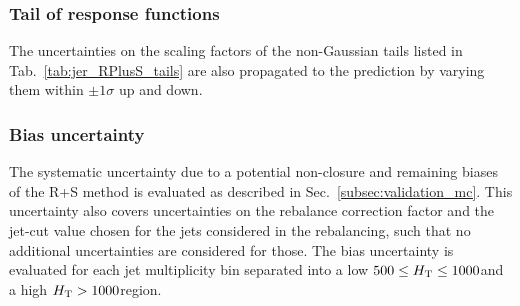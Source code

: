 \subsubsection*{Tail of response functions} The uncertainties on the scaling factors of the non-Gaussian tails listed in Tab.~\ref{tab:jer_RPlusS_tails} are also propagated to the prediction by varying them within $\pm 1\sigma$ up and down. 
\subsubsection*{Bias uncertainty} The systematic uncertainty due to a potential non-closure and remaining biases of the R+S method is evaluated as described in Sec.~\ref{subsec:validation_mc}. This uncertainty also covers uncertainties on the rebalance correction factor and the jet-\pt cut value chosen for the jets considered in the rebalancing, such that no additional uncertainties are considered for those. The bias uncertainty is evaluated for each jet multiplicity bin separated into a low $ 500 \leq H_{\text{T}} \leq 1000$\gev and a high $H_{\text{T}} > 1000$\gev region.
